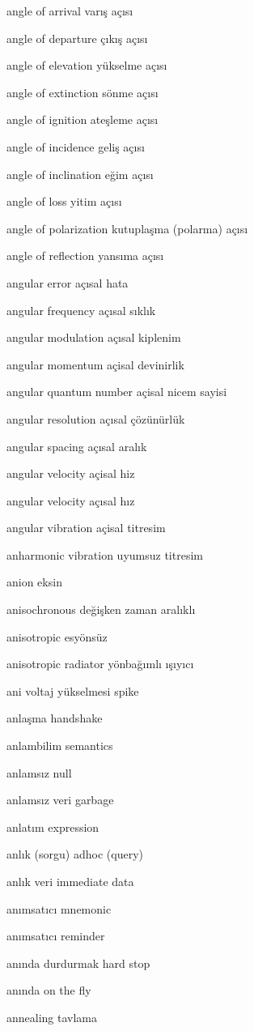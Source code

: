 \documentclass[12pt,fleqn]{article}\usepackage{../../common}
\begin{document}
angle of arrival varış açısı

angle of departure çıkış açısı

angle of elevation yükselme açısı

angle of extinction sönme açısı

angle of ignition ateşleme açısı

angle of incidence geliş açısı

angle of inclination eğim açısı

angle of loss yitim açısı

angle of polarization kutuplaşma (polarma) açısı

angle of reflection yansıma açısı

angular error açısal hata

angular frequency açısal sıklık

angular modulation açısal kiplenim

angular momentum açisal devinirlik

angular quantum number açisal nicem sayisi

angular resolution açısal çözünürlük

angular spacing açısal aralık

angular velocity açisal hiz

angular velocity açısal hız

angular vibration açisal titresim

anharmonic vibration uyumsuz titresim

anion eksin

anisochronous değişken zaman aralıklı

anisotropic esyönsüz

anisotropic radiator yönbağımlı ışıyıcı

ani voltaj yükselmesi spike

anlaşma handshake

anlambilim semantics

anlamsız null

anlamsız veri garbage

anlatım expression

anlık (sorgu) adhoc (query)

anlık veri immediate data

anımsatıcı mnemonic

anımsatıcı reminder

anında durdurmak hard stop

anında on the fly

annealing tavlama
\end{document}
